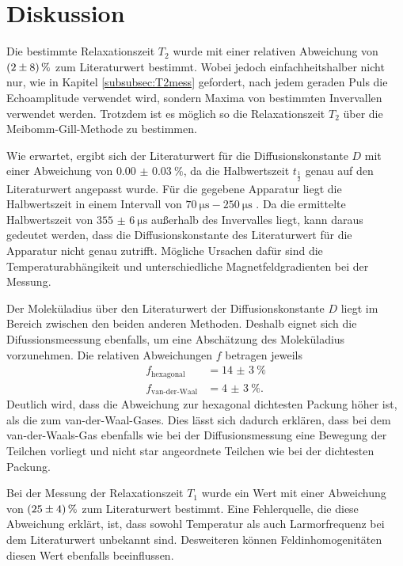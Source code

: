 \newpage
\section{Diskussion}
\label{sec:Diskussion}

Die bestimmte Relaxationszeit $T_{2}$ wurde mit einer
relativen Abweichung von $\SI{2+-8}{\percent}$
zum Literaturwert bestimmt.
Wobei jedoch einfachheitshalber nicht nur, wie in Kapitel \ref{subsubsec:T2mess}
gefordert, nach jedem geraden
Puls die Echoamplitude verwendet wird, sondern Maxima von bestimmten Invervallen verwendet werden.
Trotzdem ist es möglich so die Relaxationszeit $T_{2}$ über die
Meibomm-Gill-Methode zu bestimmen.

Wie erwartet, ergibt sich der Literaturwert für die Diffusionskonstante $D$
mit einer Abweichung von $\SI{0.00(3)}{\percent}$, da die Halbwertszeit $t_{\frac{1}{2}}$
genau auf den Literaturwert angepasst wurde.
Für die gegebene Apparatur liegt die Halbwertszeit in einem Intervall
von $\SI{70}{\micro\second}-\SI{250}{\micro\second}$ \cite{talk}.
Da die ermittelte Halbwertszeit von $\SI{355(6)}{\micro\second}$
außerhalb des Invervalles liegt, kann daraus gedeutet werden,
dass die Diffusionskonstante des Literaturwert für die Apparatur nicht genau zutrifft.
Mögliche Ursachen dafür sind die Temperaturabhängikeit und unterschiedliche
Magnetfeldgradienten bei der Messung.

Der Moleküladius über den Literaturwert der Diffusionskonstante $D$
liegt im Bereich zwischen den beiden anderen Methoden. Deshalb eignet sich die
Difussionsmeessung ebenfalls, um eine Abschätzung des Moleküladius vorzunehmen.
Die relativen Abweichungen $f$ betragen jeweils
\begin{align*}
  f_{\text{hexagonal}}&=\SI{14(3)}{\percent}\\
  f_{\text{van-der-Waal}}&=\SI{4(3)}{\percent}.
\end{align*}
Deutlich wird, dass die Abweichung zur hexagonal dichtesten Packung
höher ist, als die zum van-der-Waal-Gases.
Dies lässt sich dadurch erklären, dass bei dem van-der-Waals-Gas
ebenfalls
wie bei der Diffusionsmessung eine Bewegung der Teilchen vorliegt
und nicht star angeordnete Teilchen wie bei der dichtesten Packung.



Bei der Messung der Relaxationszeit $T_{1}$ wurde ein Wert mit einer Abweichung von $\SI{25+-4}{\percent}$ zum Literaturwert bestimmt.
Eine Fehlerquelle, die diese Abweichung erklärt,
ist, dass sowohl Temperatur als auch Larmorfrequenz bei dem Literaturwert unbekannt sind.
Desweiteren können Feldinhomogenitäten diesen Wert ebenfalls beeinflussen.
